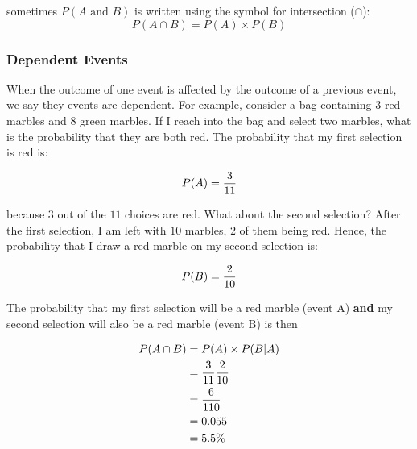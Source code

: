 sometimes $P(A\text{ and } B)$ is written using the symbol for
intersection ($\cap$):
\begin{equation}\label{eq:andprobability}
  P(A \cap B) = P(A) \times P(B)
\end{equation}




\subsubsection{Dependent Events}
When the outcome of one event is affected by the outcome of a previous
event, we say they events are dependent.  For example, consider a bag
containing $3$ red marbles and $8$ green marbles.  If I reach into the
bag and select two marbles, what is the probability that they are both
red.  The probability that my first selection is red is:

\begin{equation}
P(A) = {3\over 11}  \nonumber
\end{equation}


because $3$ out of the $11$ choices are red.  What about the second
selection?  After the first selection, I am left with $10$ marbles,
$2$ of them being red.  Hence, the probability that I draw a red
marble on my second selection is:

\begin{equation}
 P(B) = {2\over 10}\nonumber
\end{equation}

The probability that my first selection will be a red marble (event A)
\textbf{and} my second selection will also be a red marble (event B)
is then

\begin{align}
  P(A \cap B) &= P(A) \times P(B|A)\nonumber\\
              &= {3\over 11} {2\over 10}\nonumber\\
              &= {6 \over 110}\nonumber\\
              &= 0.055 \nonumber\\
              &= 5.5\%\nonumber
\end{align}

